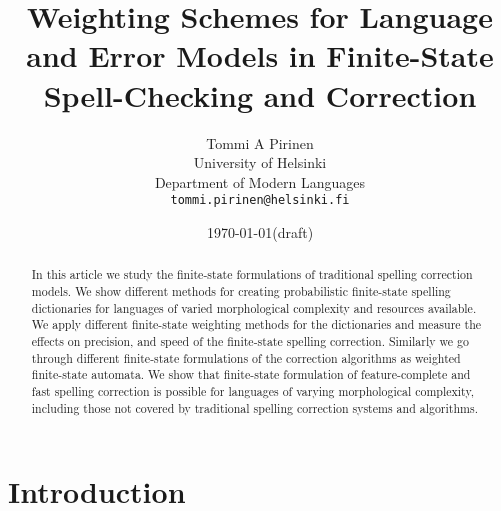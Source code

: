 \documentclass[a4paper,12pt]{article}
\title{Weighting Schemes for Language and Error Models in Finite-State
    Spell-Checking and Correction}
\author{Tommi A Pirinen\\
 [0.5cm] University of Helsinki\\ %
 Department of Modern Languages\\ %
 \texttt{tommi.pirinen@helsinki.fi}}   %
\date{\today (draft)}
\begin{document}
\ifpdf
{}
\fi

\maketitle 
\thispagestyle{empty}

\begin{abstract}
\noindent 
In this article we  study the finite-state formulations of traditional spelling
correction models. We show different methods for creating probabilistic
finite-state spelling dictionaries for languages of varied morphological
complexity and resources available. We
apply different finite-state weighting methods for the dictionaries and measure
the effects on precision, and speed of the finite-state spelling correction.
Similarly we go through different finite-state formulations of the correction
algorithms as weighted finite-state automata. We show that finite-state
formulation of feature-complete and fast spelling correction is possible for
languages of varying morphological complexity, including those not covered by
traditional spelling correction systems and algorithms.
\end{abstract}

\listoftodos

\section{Introduction} 
\end{document}
